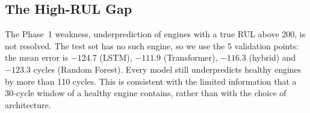 \subsection{The High-RUL Gap}
The Phase~1 weakness, underprediction of engines with a true RUL above 200, is not resolved.  The test set has no such engine, so we use the 5 validation points: the mean error is $-124.7$ (LSTM), $-111.9$ (Transformer), $-116.3$ (hybrid) and $-123.3$ cycles (Random Forest).  Every model still underpredicts healthy engines by more than 110 cycles.  This is consistent with the limited information that a 30-cycle window of a healthy engine contains, rather than with the choice of architecture.
